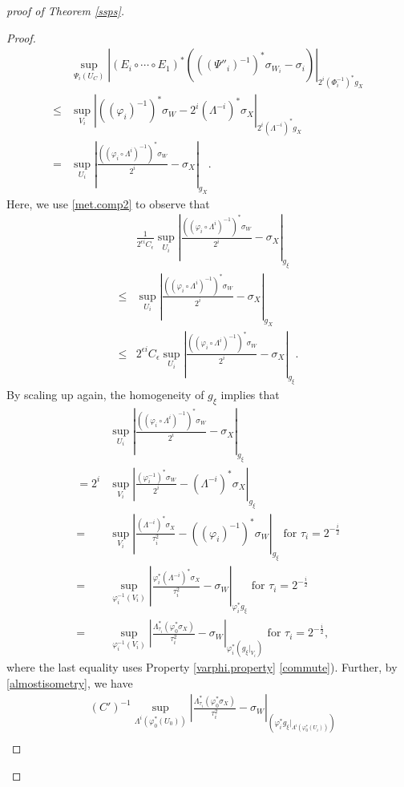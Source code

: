 \documentclass[12pt,a4paper]{amsart}
\theoremstyle{remark}
\theoremstyle{definition}
\begin{document}
\begin{proof}[proof of Theorem \ref{ssps}]
\begin{proof}
\begin{align}
&\sup_{\Psi_i(U_C)}|(E_i \circ \cdots \circ E_1)^{*}(((\Psi''_i)^{-1})^*\sigma_{W_i}-
\sigma_{i})|_{2^i (\Phi_i^{-1})^* g_X}\\
\le&\sup_{V_i}|((\varphi_i)^{-1})^* \sigma_W-2^i (\Lambda^{-i})^{*}\sigma_X|_{2^i (\Lambda^{-i})^* g_X}\\
=&\label{difffun}\sup_{U_i}|\frac{((\varphi_i\circ \Lambda^i)^{-1})^* \sigma_W}{2^i}-\sigma_X|_{g_X}.
\end{align}
Here, we use \eqref{met.comp2} to observe that 
\begin{align}
&\frac{1}{2^{\epsilon i} C_\epsilon}
\sup_{U_i}|\frac{((\varphi_i\circ \Lambda^i)^{-1})^* \sigma_W}{2^i}-\sigma_X|_{g_\xi}\\
\le 
&\sup_{U_i}|\frac{((\varphi_i\circ \Lambda^i)^{-1})^* \sigma_W}{2^i}-\sigma_X|_{g_X}\\
\le 
&2^{\epsilon i} C_\epsilon 
\sup_{U_i}|\frac{((\varphi_i\circ \Lambda^i)^{-1})^* \sigma_W}{2^i}-\sigma_X|_{g_\xi}. 
\end{align}
By scaling up again, the homogeneity of $g_\xi$ implies that 
\begin{align}
&\sup_{U_i}|\frac{((\varphi_i\circ \Lambda^i)^{-1})^* \sigma_W}{2^i}-\sigma_X|_{g_\xi}\\
=2^i &\sup_{V_i}|\frac{(\varphi_i^{-1})^* \sigma_W}{2^i}-(\Lambda^{-i})^*\sigma_X|_{g_\xi} \\
=&\sup_{V_i}|\frac{(\Lambda^{-i})^* \sigma_X}{\tau_i^{2}}-((\varphi_i)^{-1})^* \sigma_W|_{g_\xi} \text{ for }\tau_i=2^{-\frac{i}{2}}\\
=&\sup_{\varphi_i^{-1}(V_i)}
|\frac{\varphi_i^*(\Lambda^{-i})^* \sigma_X}{\tau_i^{2}}-\sigma_W|_{\varphi_i^* g_\xi} \text{ for }\tau_i=2^{-\frac{i}{2}}\\
=\label{diff.fun}&\sup_{\varphi_i^{-1}(V_i)}
|\frac{\Lambda_{\tau_i}^*(\varphi_0^*\sigma_X)}{\tau_i^{2}}-\sigma_W|_{\varphi_i^* (g_\xi|_{V_i})} 
\text{ for }\tau_i=2^{-\frac{i}{2}}, 
\end{align}
\noindent 
where the last equality uses 
Property \ref{varphi.property} \eqref{commute}). 
Further, by %
\eqref{almostisometry}, 
we have 
\begin{align}
&(C')^{-1}\sup_{\Lambda^i(\varphi_0^*(U_0))}|\frac{\Lambda_{\tau_i}^*(\varphi_0^*\sigma_X)}{\tau_i^{2}}-\sigma_W|_{(\varphi_i^* g_\xi|_{\Lambda^i(\varphi_0^*(U_i))})}\\

\end{align}
\end{proof}
\end{proof}
\end{document}
